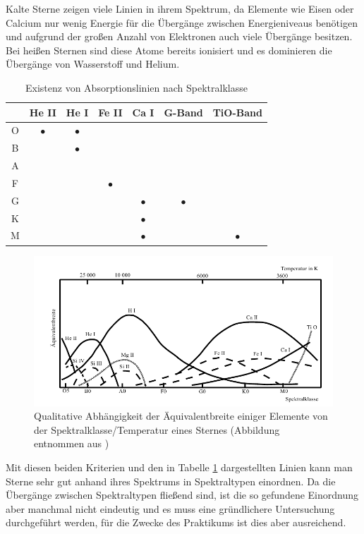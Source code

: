 Kalte Sterne zeigen viele Linien in ihrem Spektrum, da Elemente wie Eisen oder Calcium nur wenig Energie für die Übergänge zwischen Energieniveaus benötigen und aufgrund der großen Anzahl von Elektronen auch viele Übergänge besitzen. Bei heißen Sternen sind diese Atome bereits ionisiert und es dominieren die Übergänge von Wasserstoff und Helium.

\begin{table}
\centering
\begin{tabular}{c|c|c|c|c|c|c}

 & He II & He I & Fe II & Ca I & G-Band & TiO-Band \\ 
\hline 
O & $\bullet$ & $\bullet$ &  &  &  &  \\ 
\hline 
B &  & $\bullet$ &  &  &  &  \\ 
\hline 
A &  &  &  &  &  &  \\ 
\hline 
F &  &  & $\bullet$ &  &  & \\ 
\hline
G &  &  &  & $\bullet$ & $\bullet$ &  \\ 
\hline 
K &  &  &  & $\bullet$ &  &  \\ 
\hline 
M &  &  &  & $\bullet$ &  & $\bullet$ \\ 
\end{tabular}
\caption{Existenz von Absorptionslinien nach Spektralklasse}
\label{tab:Spektralklassen}
\end{table}

\begin{figure}
\includegraphics[width=1\textwidth]{images/Spektralklassen.png}
\caption{Qualitative Abhängigkeit der Äquivalentbreite einiger Elemente von der Spektralklasse/Temperatur eines Sternes (Abbildung entnommen aus \cite{ronomischesPraktikum})}
\label{fig:Harvard}
\end{figure}

Mit diesen beiden Kriterien und den in Tabelle \ref{tab:Spektralklassen} dargestellten Linien kann man Sterne sehr gut anhand ihres Spektrums in Spektraltypen einordnen. Da die Übergänge zwischen Spektraltypen fließend sind, ist die so gefundene Einordnung aber manchmal nicht eindeutig und es muss eine gründlichere Untersuchung durchgeführt werden, für die Zwecke des Praktikums ist dies aber ausreichend.

